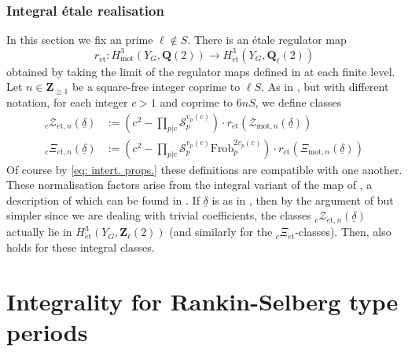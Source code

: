 \documentclass{amsart}%
\theoremstyle{plain}
\theoremstyle{plain}
\theoremstyle{remark}
\begin{document}
\subsubsection{Integral \'etale realisation}\label{sec etale realisation}
In this section we fix an prime $\ell\notin S$. There is an \'etale regulator map
$$r_{\acute{e}\text{t}}: H_\mathrm{mot}^3(Y_G,\mathbf{Q}(2))\longrightarrow H_{\acute{e}\text{t}}^3(Y_G,\mathbf{Q}_\ell(2))$$
obtained by taking the limit of the regulator maps defined in \cite{huber2000realization} at each finite level. Let $n\in\mathbf{Z}_{\geq 1}$ be a square-free integer coprime to $\ell S$. As in \cite{Loeffler_2021}, but with different notation, for each integer $c>1$ and coprime to $6nS$, we define classes
\begin{align*}_c\mathcal{Z}_{\acute{e}\text{t},n}\left(\underline{\delta}\right)&:=\left(c^2-\prod_{p| c}\mathcal{S}_p^{v_p(c)}\right)\cdot r_{\acute{e}\text{t}}\left(\mathcal{Z}_{\mathrm{mot},n}\left(\underline{\delta}\right)\right)\\
_c\Xi_{\acute{e}\text{t},n}(\underline{\delta})&:= \left(c^2-\prod_{p| c}\mathcal{S}_p^{v_p(c)}\mathrm{Frob}_p^{2v_p(c)}\right)\cdot r_{\acute{e}\text{t}}\left(\Xi_{\mathrm{mot},n}\left(\underline{\delta}\right)\right)\end{align*}
Of course by \eqref{eq: intert. props.} these definitions are compatible with one another. 
These normalisation factors arise from the integral variant of the map of , a description of which can be found in \cite[\S $7$]{Loeffler_Skinner_Zerbes_2021}. If $\underline{\delta}$ is as in , then by the argument of \cite[Proposition $9.5.2$]{Loeffler_2021} but simpler since we are dealing with trivial coefficients, the classes $_c\mathcal{Z}_{\acute{e}\text{t},n}\left(\underline{\delta}\right)$ actually lie in $H_{\acute{e}\text{t}}^3(Y_G,\mathbf{Z}_\ell(2))$ (and similarly for the $_c\Xi_{\acute{e}\text{t}}$-classes). Then,  also holds for these integral classes.
   \section{Integrality for Rankin-Selberg type periods}\label{sec int periods}
\end{document}
